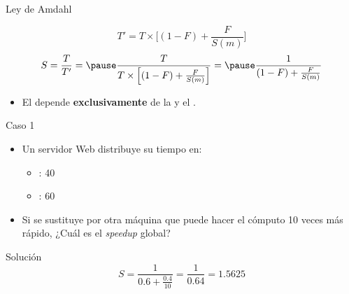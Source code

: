 \begin{frame}[t]{Ley de Amdahl}
\begin{small}
\begin{displaymath}
T'=T \times \Big[ (1 - F) + \frac{F}{S(m)} \Big]
\end{displaymath}
\pause
\begin{displaymath}
S=\frac{T}{T'}=\pause
\frac{T}{T \times \Big[ (1 - F) + \frac{F}{S(m)} \Big]} =\pause
\frac{1}{(1 - F) + \frac{F}{S(m)}}
\end{displaymath}
\end{small}
\begin{itemize}
  \item El  depende \textbf{exclusivamente} de
        la  y el .
\end{itemize}
\end{frame}

\begin{frame}[t]{Caso 1}
\begin{itemize}
  \item Un servidor Web distribuye su tiempo en:
    \begin{itemize}
      \item {}: 40%
      \item {}: 60%
    \end{itemize}
  \item Si se sustituye por otra máquina que puede hacer el 
        cómputo 10 veces más rápido, ¿Cuál es el \emph{speedup} global?
\end{itemize}
\begin{block}{Solución}
\begin{displaymath}
S=
\frac{1}{0.6+\frac{0.4}{10}} =
\frac{1}{0.64} =
1.5625
\end{displaymath}
\end{block}
\end{frame}

